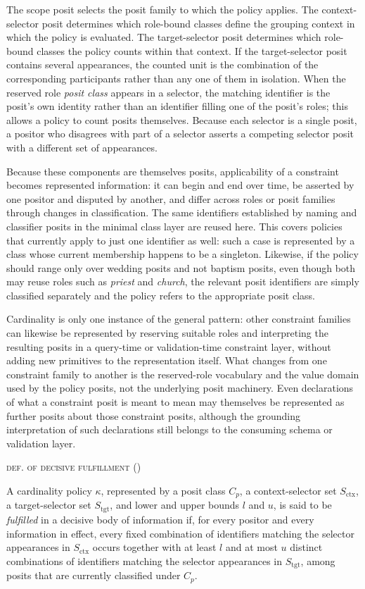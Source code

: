 \documentclass[a4paper,fleqn]{cas-sc}
\newcounter{majorcount}
\newcommand{\deffy}[3]{
	\vspace{2ex}
	\refstepcounter{majorcount}
	\noindent\textsc{#1} {\normalfont(\arabic{majorcount})}
	\\\begin{small}
	\noindent #2%
	\label{Def:#3}
	\end{small}
	\vspace{2ex}
}
\begin{document}
The scope posit selects the posit family to which the policy applies. The context-selector posit determines which role-bound classes define the grouping context in which the policy is evaluated. The target-selector posit determines which role-bound classes the policy counts within that context. If the target-selector posit contains several appearances, the counted unit is the combination of the corresponding participants rather than any one of them in isolation. When the reserved role \textit{posit class} appears in a selector, the matching identifier is the posit's own identity rather than an identifier filling one of the posit's roles; this allows a policy to count posits themselves. Because each selector is a single posit, a positor who disagrees with part of a selector asserts a competing selector posit with a different set of appearances.

Because these components are themselves posits, applicability of a constraint becomes represented information: it can begin and end over time, be asserted by one positor and disputed by another, and differ across roles or posit families through changes in classification. The same identifiers established by naming and classifier posits in the minimal class layer are reused here. This covers policies that currently apply to just one identifier as well: such a case is represented by a class whose current membership happens to be a singleton. Likewise, if the policy should range only over wedding posits and not baptism posits, even though both may reuse roles such as \textit{priest} and \textit{church}, the relevant posit identifiers are simply classified separately and the policy refers to the appropriate posit class.

Cardinality is only one instance of the general pattern: other constraint families can likewise be represented by reserving suitable roles and interpreting the resulting posits in a query-time or validation-time constraint layer, without adding new primitives to the representation itself. What changes from one constraint family to another is the reserved-role vocabulary and the value domain used by the policy posits, not the underlying posit machinery. Even declarations of what a constraint posit is meant to mean may themselves be represented as further posits about those constraint posits, although the grounding interpretation of such declarations still belongs to the consuming schema or validation layer.

\deffy{def. of decisive fulfillment}{%
A cardinality policy \(\kappa\), represented by a posit class \(C_p\), a context-selector set \(S_{\mathrm{ctx}}\), a target-selector set \(S_{\mathrm{tgt}}\), and lower and upper bounds \(l\) and \(u\), is said to be \emph{fulfilled} in a decisive body of information if, for every positor and every information in effect, every fixed combination of identifiers matching the selector appearances in \(S_{\mathrm{ctx}}\) occurs together with at least \(l\) and at most \(u\) distinct combinations of identifiers matching the selector appearances in \(S_{\mathrm{tgt}}\), among posits that are currently classified under \(C_p\).}{fulfillment}
\end{document}

